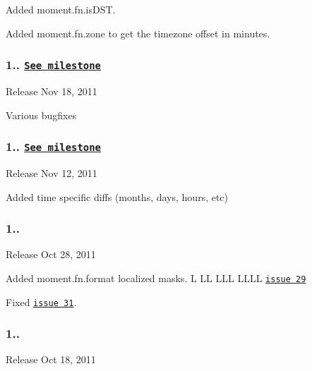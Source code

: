 Added {\ttfamily moment.\+fn.\+is\+D\+ST}.

Added {\ttfamily moment.\+fn.\+zone} to get the timezone offset in minutes.

\subsubsection*{1.. \href{https://github.com/timrwood/moment/issues?milestone=6&state=closed}{\tt See milestone}}


\begin{DoxyItemize}
\item Release Nov 18, 2011
\end{DoxyItemize}

Various bugfixes

\subsubsection*{1.. \href{https://github.com/timrwood/moment/issues?milestone=5&state=closed}{\tt See milestone}}


\begin{DoxyItemize}
\item Release Nov 12, 2011
\end{DoxyItemize}

Added time specific diffs (months, days, hours, etc)

\subsubsection*{1..}


\begin{DoxyItemize}
\item Release Oct 28, 2011
\end{DoxyItemize}

Added {\ttfamily moment.\+fn.\+format} localized masks. \textquotesingle{}L LL L\+LL L\+L\+LL\textquotesingle{} \href{https://github.com/timrwood/moment/pull/29}{\tt issue 29}

Fixed \href{https://github.com/timrwood/moment/pull/31}{\tt issue 31}.

\subsubsection*{1..}


\begin{DoxyItemize}
\item Release Oct 18, 2011
\end{DoxyItemize}

